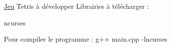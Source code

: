 \hyperlink{classJeu}{Jeu} Tetris à développer Librairies à télécharger \+:
\begin{DoxyItemize}
\item ncurses
\end{DoxyItemize}

Pour compiler le programme \+: g++ main.\+cpp -\/lncurses 